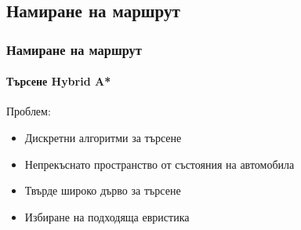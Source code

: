 \documentclass[hyperref=unicode]{beamer}
\begin{document}
    \subsection{Намиране на маршрут}
    \begin{frame}
      \frametitle{Намиране на маршрут}
      \framesubtitle{Търсене Hybrid A*}
      Проблем:
         \begin{itemize}
          \item{Дискретни алгоритми за търсене}
          \item{Непрекъснато пространство от състояния на автомобила}
          \item{Твърде широко дърво за търсене}
          \item{Избиране на подходяща евристика}
        \end{itemize}
    \end{frame}
\end{document}
